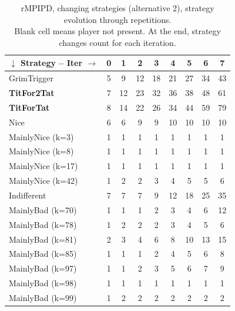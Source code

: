 \documentclass[journal,10pt,twoside]{IEEEtran}
\begin{document}
\begin{table}[ht]
    \caption{rMPIPD, changing strategies (alternative 2), strategy evolution through repetitions.\\
    Blank cell means player not present. At the end, strategy changes count for each iteration.}
    \label{tab:cripdmpA2}
    \centering
    \begin{minipage}{.55\textwidth}
    \begin{tabular}{l|cccccccc} \toprule
        $\downarrow$ Strategy -- Iter $\rightarrow$ & 0 & 1 & 2 & 3 & 4 & 5 & 6 & 7 \\ \midrule
        GrimTrigger         &   5 &   9 &   12 &   18 &   21 &   27 &   34 &   43 \\
        \textbf{TitFor2Tat} &   7 &  12 &   23 &   32 &   36 &   38 &   48 &   61 \\
        \textbf{TitForTat}  &   8 &  14 &   22 &   26 &   34 &   44 &   59 &   79 \\
        Nice                &   6 &   6 &    9 &    9 &   10 &   10 &   10 &   10 \\
        MainlyNice (k=3)    &   1 &   1 &    1 &    1 &    1 &    1 &    1 &    1 \\
        MainlyNice (k=8)    &   1 &   1 &    1 &    1 &    1 &    1 &    1 &    1 \\
        MainlyNice (k=17)   &   1 &   1 &    1 &    1 &    1 &    1 &    1 &    1 \\
        MainlyNice (k=42)   &   1 &   2 &    2 &    3 &    4 &    5 &    5 &    6 \\
        Indifferent         &   7 &   7 &    7 &    9 &   12 &   18 &   25 &   35 \\
        MainlyBad (k=70)    &   1 &   1 &    1 &    2 &    3 &    4 &    6 &   12 \\
        MainlyBad (k=78)    &   1 &   2 &    2 &    2 &    3 &    4 &    5 &    6 \\
        MainlyBad (k=81)    &   2 &   3 &    4 &    6 &    8 &   10 &   13 &   15 \\
        MainlyBad (k=85)    &   1 &   1 &    1 &    2 &    4 &    5 &    6 &    8 \\
        MainlyBad (k=97)    &   1 &   1 &    2 &    3 &    5 &    6 &    7 &    9 \\
        MainlyBad (k=98)    &   1 &   1 &    1 &    1 &    1 &    1 &    1 &    1 \\
        MainlyBad (k=99)    &   1 &   2 &    2 &    2 &    2 &    2 &    2 &    2 \\

\end{tabular}
\end{minipage}
\end{table}
\end{document}
